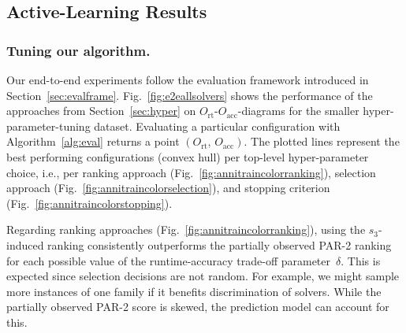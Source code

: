 \documentclass[runningheads]{llncs}
\begin{document}
\subsection{Active-Learning Results}

\subsubsection{Tuning our algorithm.}

Our end-to-end experiments follow the evaluation framework introduced in Section~\ref{sec:evalframe}.
Fig.~\ref{fig:e2eallsolvers} shows the performance of the approaches from Section~\ref{sec:hyper} on $O_{\operatorname{rt}}$-$O_{\operatorname{acc}}$-diagrams for the smaller hyper-parameter-tuning dataset.
Evaluating a particular configuration with Algorithm~\ref{alg:eval} returns a point $\left(O_{\operatorname{rt}},\, O_{\operatorname{acc}}\right)$.
The plotted lines represent the best performing configurations (convex hull) per top-level hyper-parameter choice, i.e., per ranking approach (Fig.~\ref{fig:annitraincolorranking}), selection approach (Fig.~\ref{fig:annitraincolorselection}), and stopping criterion (Fig.~\ref{fig:annitraincolorstopping}).

Regarding ranking approaches (Fig.~\ref{fig:annitraincolorranking}), using the $s_3$-induced ranking consistently outperforms the partially observed PAR-2 ranking for each possible value of the runtime-accuracy trade-off parameter~$\delta$.
This is expected since selection decisions are not random.
For example, we might sample more instances of one family if it benefits discrimination of solvers.
While the partially observed PAR-2 score is skewed, the prediction model can account for this.
\end{document}
